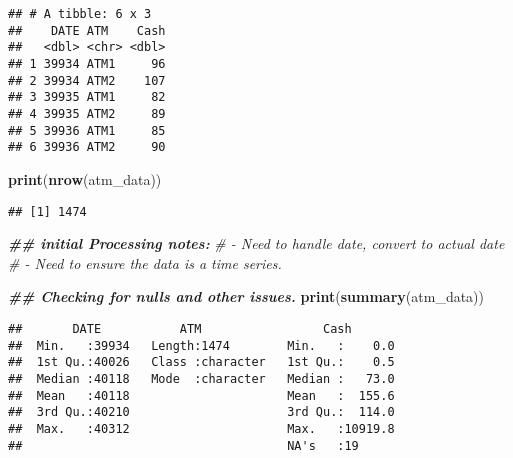 \documentclass[
]{article}
\newenvironment{Shaded}{\begin{snugshade}}{\end{snugshade}}
\newcommand{\CommentTok}[1]{\textcolor[rgb]{0.56,0.35,0.01}{\textit{#1}}}
\newcommand{\DocumentationTok}[1]{\textcolor[rgb]{0.56,0.35,0.01}{\textbf{\textit{#1}}}}
\newcommand{\FunctionTok}[1]{\textcolor[rgb]{0.13,0.29,0.53}{\textbf{#1}}}
\newcommand{\NormalTok}[1]{#1}
\newcommand{\SpecialCharTok}[1]{\textcolor[rgb]{0.81,0.36,0.00}{\textbf{#1}}}
\begin{document}
\begin{verbatim}
## # A tibble: 6 x 3
##    DATE ATM    Cash
##   <dbl> <chr> <dbl>
## 1 39934 ATM1     96
## 2 39934 ATM2    107
## 3 39935 ATM1     82
## 4 39935 ATM2     89
## 5 39936 ATM1     85
## 6 39936 ATM2     90
\end{verbatim}

\begin{Shaded}
\begin{Highlighting}[]
\FunctionTok{print}\NormalTok{(}\FunctionTok{nrow}\NormalTok{(atm\_data))}
\end{Highlighting}
\end{Shaded}

\begin{verbatim}
## [1] 1474
\end{verbatim}

\begin{Shaded}
\begin{Highlighting}[]
\DocumentationTok{\#\# initial Processing notes:}
\CommentTok{\# {-} Need to handle date, convert to actual date}
\CommentTok{\# {-} Need to ensure the data is a time series. }
\end{Highlighting}
\end{Shaded}

\begin{Shaded}
\begin{Highlighting}[]
\DocumentationTok{\#\# Checking for nulls and other issues.}
\FunctionTok{print}\NormalTok{(}\FunctionTok{summary}\NormalTok{(atm\_data))}
\end{Highlighting}
\end{Shaded}

\begin{verbatim}
##       DATE           ATM                 Cash        
##  Min.   :39934   Length:1474        Min.   :    0.0  
##  1st Qu.:40026   Class :character   1st Qu.:    0.5  
##  Median :40118   Mode  :character   Median :   73.0  
##  Mean   :40118                      Mean   :  155.6  
##  3rd Qu.:40210                      3rd Qu.:  114.0  
##  Max.   :40312                      Max.   :10919.8  
##                                     NA's   :19
\end{verbatim}

\begin{Shaded}
\end{Shaded}
\end{document}
